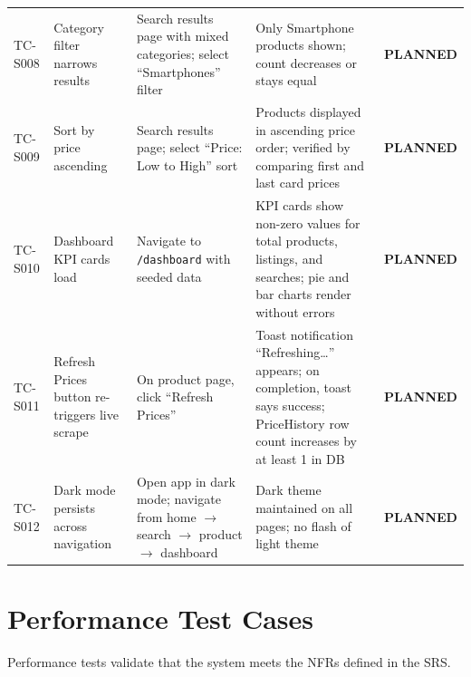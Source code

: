\documentclass[12pt,a4paper]{report}
\newcommand{\PEND}{\textcolor{pendyellow}{\textbf{PLANNED}}}
\begin{document}
\begin{longtable}{C{1.6cm} L{3.5cm} L{4cm} L{3.5cm} C{1.5cm}}
  TC-S008 &
    Category filter narrows results &
    Search results page with mixed categories; select ``Smartphones'' filter &
    Only Smartphone products shown; count decreases or stays equal &
    \PEND \\

  TC-S009 &
    Sort by price ascending &
    Search results page; select ``Price: Low to High'' sort &
    Products displayed in ascending price order; verified by comparing first
    and last card prices &
    \PEND \\

  TC-S010 &
    Dashboard KPI cards load &
    Navigate to \texttt{/dashboard} with seeded data &
    KPI cards show non-zero values for total products, listings, and searches;
    pie and bar charts render without errors &
    \PEND \\

  TC-S011 &
    Refresh Prices button re-triggers live scrape &
    On product page, click ``Refresh Prices'' &
    Toast notification ``Refreshing\ldots'' appears; on completion, toast says
    success; PriceHistory row count increases by at least 1 in DB &
    \PEND \\

  TC-S012 &
    Dark mode persists across navigation &
    Open app in dark mode; navigate from home $\to$ search $\to$ product $\to$ dashboard &
    Dark theme maintained on all pages; no flash of light theme &
    \PEND \\

\end{longtable}

\chapter{Performance Test Cases}

Performance tests validate that the system meets the NFRs defined in the SRS.
\end{document}
